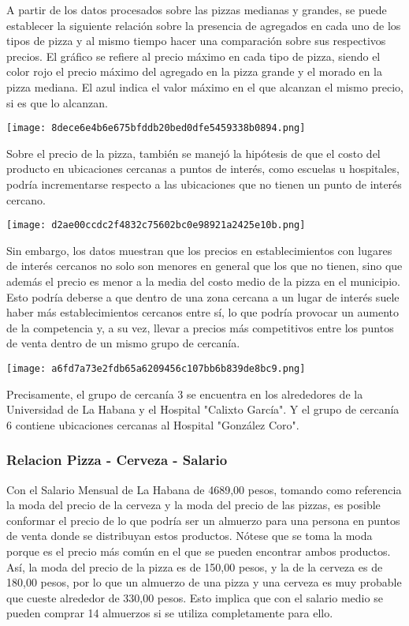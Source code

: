 A partir de los datos procesados sobre las pizzas medianas y grandes, se
puede establecer la siguiente relación sobre la presencia de agregados
en cada uno de los tipos de pizza y al mismo tiempo hacer una
comparación sobre sus respectivos precios. El gráfico se refiere al
precio máximo en cada tipo de pizza, siendo el color rojo el precio
máximo del agregado en la pizza grande y el morado en la pizza mediana.
El azul indica el valor máximo en el que alcanzan el mismo precio, si es
que lo alcanzan.


\texttt{[image: 8dece6e4b6e675bfddb20bed0dfe5459338b0894.png]}

Sobre el precio de la pizza, también se manejó la hipótesis de que el
costo del producto en ubicaciones cercanas a puntos de interés, como
escuelas u hospitales, podría incrementarse respecto a las ubicaciones
que no tienen un punto de interés cercano.


\texttt{[image: d2ae00ccdc2f4832c75602bc0e98921a2425e10b.png]}

Sin embargo, los datos muestran que los precios en establecimientos con
lugares de interés cercanos no solo son menores en general que los que
no tienen, sino que además el precio es menor a la media del costo medio
de la pizza en el municipio. Esto podría deberse a que dentro de una
zona cercana a un lugar de interés suele haber más establecimientos
cercanos entre sí, lo que podría provocar un aumento de la competencia
y, a su vez, llevar a precios más competitivos entre los puntos de venta
dentro de un mismo grupo de cercanía.


\texttt{[image: a6fd7a73e2fdb65a6209456c107bb6b839de8bc9.png]}

Precisamente, el grupo de cercanía 3 se encuentra en los alrededores de
la Universidad de La Habana y el Hospital "Calixto García". Y el grupo
de cercanía 6 contiene ubicaciones cercanas al Hospital "González Coro".

\hypertarget{relacion-pizza---cerveza---salario}{%
\subsubsection{Relacion Pizza - Cerveza -
Salario}\label{relacion-pizza---cerveza---salario}}

Con el Salario Mensual de La Habana de 4689,00 pesos, tomando como
referencia la moda del precio de la cerveza y la moda del precio de las
pizzas, es posible conformar el precio de lo que podría ser un almuerzo
para una persona en puntos de venta donde se distribuyan estos
productos. Nótese que se toma la moda porque es el precio más común en
el que se pueden encontrar ambos productos. Así, la moda del precio de
la pizza es de 150,00 pesos, y la de la cerveza es de 180,00 pesos, por
lo que un almuerzo de una pizza y una cerveza es muy probable que cueste
alrededor de 330,00 pesos. Esto implica que con el salario medio se
pueden comprar 14 almuerzos si se utiliza completamente para ello.

